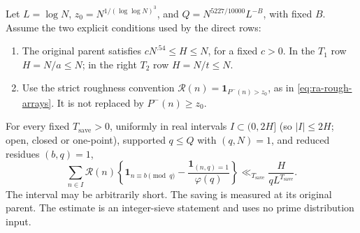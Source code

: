 \begin{lemma}\label{hyp:ra-rough}
Let \(L=\log N\), \(z_0=N^{1/(\log\log N)^3}\), and
\(Q=N^{5227/10000}L^{-B}\), with fixed \(B\). Assume the two explicit
conditions used by the direct rows:
\begin{enumerate}
 \item[(W1)] The original parent satisfies
 \(cN^{.54}\le H\le N\), for a fixed \(c>0\). In the \(T_1\) row
 \(H=N/a\le N\); in the right \(T_2\) row \(H=N/t\le N\).
 \item[(W2)] Use the strict roughness convention
 \(\mathcal R(n)=\mathbf1_{P^-(n)>z_0}\), as in
 \eqref{eq:ra-rough-arrays}. It is not replaced by
 \(P^-(n)\ge z_0\).
\end{enumerate}
For every fixed \(T_{\mathrm{save}}>0\), uniformly in real intervals \(I\subset(0,2H]\)
(so \(|I|\le2H\); open, closed or one-point),
supported \(q\le Q\) with \((q,N)=1\), and reduced residues \((b,q)=1\),
\begin{equation}\label{eq:ra-theorem-r}
 \sum_{n\in I}\mathcal R(n)
 \left\{\mathbf1_{n\equiv b\pmod q}
          -\frac{\mathbf1_{(n,q)=1}}{\varphi(q)}\right\}
 \ll_{T_{\mathrm{save}}}\frac{H}{qL^{T_{\mathrm{save}}}}.
\end{equation}
The interval may be arbitrarily short.
The saving is measured at its original parent. The estimate is an integer-sieve statement and uses no prime
distribution input.
\end{lemma}
